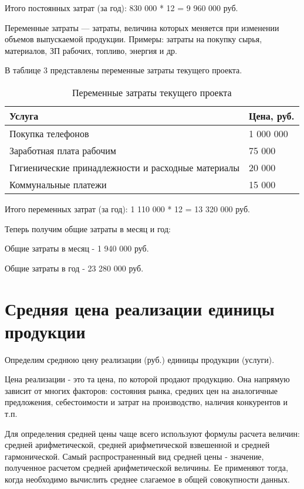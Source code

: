 Итого постоянных затрат (за год): 830 000 * 12 = 9 960 000 руб.

Переменные затраты — затраты, величина которых меняется при изменении
объемов выпускаемой продукции. Примеры: затраты на покупку сырья,
материалов, ЗП рабочих, топливо, энергия и др.

В таблице 3 представлены переменные затраты текущего проекта.

\begin{table}[h!]
	\caption{Переменные затраты текущего проекта}
	\begin{tabular}{|p{12cm}|p{4cm}|}
		\hline
		Услуга & Цена, руб. \\
		\hline
		Покупка телефонов & 1 000 000 \\
		\hline
		Заработная плата рабочим
 & 75 000 \\
		\hline
		Гигиенические принадлежности и расходные материалы & 20 000 \\
		\hline
		Коммунальные платежи & 15 000 \\
		\hline
	\end{tabular}
\end{table}

Итого переменных затрат (за год): 1 110 000 * 12 = 13 320 000 руб.

Теперь получим общие затраты в месяц и год:

Общие затраты в месяц - 1 940 000 руб.

Общие затраты в год - 23 280 000 руб.

\newpage
\section*{Средняя цена реализации единицы продукции}

Определим среднюю цену реализации (руб.) единицы продукции (услуги).

Цена реализации - это та цена, по которой продают продукцию. Она напрямую зависит от многих факторов: состояния рынка, средних цен на аналогичные предложения, себестоимости и затрат на производство, наличия конкурентов и т.п. 

Для определения средней цены чаще всего используют формулы расчета величин: средней арифметической, средней арифметической взвешенной и средней гармонической. Самый распространенный вид средней цены - значение, полученное расчетом средней арифметической величины. Ее применяют тогда, когда необходимо вычислить среднее слагаемое в общей совокупности данных.

